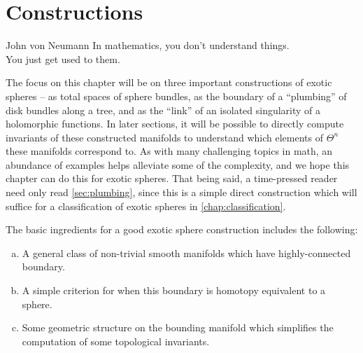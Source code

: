 \chapter{Constructions}\label{chap:constructions}
%

\begin{epigraph}{20em}{John von Neumann}
	In mathematics, you don't understand things.\\
	You just get used to them.
\end{epigraph}

The focus on this chapter will be on three important constructions of exotic spheres -- as total spaces of sphere bundles, as the boundary of a ``plumbing'' of disk bundles along a tree, and as the ``link'' of an isolated singularity of a holomorphic functions. In later sections, it will be possible to directly compute invariants of these constructed manifolds to understand which elements of $\Theta^n$ these manifolds correspond to. As with many challenging topics in math, an abundance of examples helps alleviate some of the complexity, and we hope this chapter can do this for exotic spheres.
That being said, a time-pressed reader need only read \cref{sec:plumbing}, since this is a simple direct construction which will suffice for a classification of exotic spheres in \cref{chap:classification}.

The basic ingredients for a good exotic sphere construction includes the following:
\begin{enumerate}[(a)]
	\item A general class of non-trivial smooth manifolds which have highly-connected boundary.
	\item A simple criterion for when this boundary is homotopy equivalent to a sphere.
	\item Some geometric structure on the bounding manifold which simplifies the computation of some topological invariants.
\end{enumerate}





